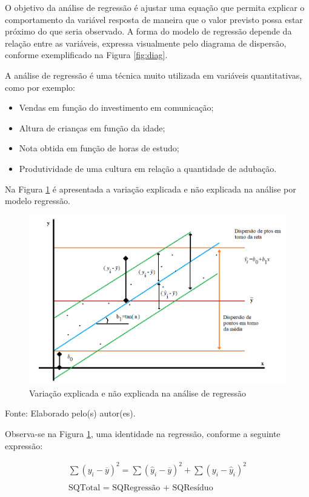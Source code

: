 \documentclass[12pt,brazil,oneside]{book}
\begin{document}
O objetivo da análise de regressão é ajustar uma equação que permita explicar o comportamento da variável resposta de maneira que o valor previsto possa estar próximo do que seria observado. A forma do modelo de regressão depende da relação entre as variáveis, expressa visualmente pelo diagrama de dispersão, conforme exemplificado na Figura \ref{fig:diag}.

A análise de regressão é uma técnica muito utilizada em variáveis quantitativas, como por exemplo:

\begin{itemize}
\item
  Vendas em função do investimento em comunicação;
\item
  Altura de crianças em função da idade;
\item
  Nota obtida em função de horas de estudo;
\item
  Produtividade de uma cultura em relação a quantidade de adubação.
\end{itemize}

Na Figura \ref{fig:regress} é apresentada a variação explicada e não explicada na análise por modelo regressão.

\begin{figure}[H]

{\centering \includegraphics[width=0.7\linewidth]{regress1} 

}

\caption{Variação explicada e não explicada na análise de regressão}\label{fig:regress}
\end{figure}

Fonte: Elaborado pelo(s) autor(es).

Observa-se na Figura \ref{fig:regress}, uma identidade na regressão, conforme a seguinte expressão:

\[
\begin{matrix}
\sum (y_i-\overline{y}) ^{2} = \sum (\hat{y}_i-\overline{y})^2 + \sum (y_i-\hat{y}_i)^2 \\
\\
\text{SQTotal = SQRegressão + SQResíduo}
\end{matrix}
\]
\end{document}
